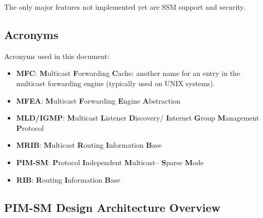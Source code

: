\documentclass[11pt]{article}
\begin{document}
The only major features not implemented yet are SSM support and security.


\subsection{Acronyms}

Acronyms used in this document:

\begin{itemize}

  \item {\bf MFC}: {\bf M}ulticast {\bf F}orwarding {\bf C}ache: another
  name for an entry in the multicast forwarding engine (typically used
  on UNIX systems).

  \item {\bf MFEA}: {\bf M}ulticast {\bf F}orwarding {\bf E}ngine
  {\bf A}bstraction

  \item {\bf MLD/IGMP}: {\bf M}ulticast {\bf L}istener {\bf D}iscovery/{\bf
  I}nternet {\bf G}roup {\bf M}anagement {\bf P}rotocol

  \item {\bf MRIB}: {\bf M}ulticast {\bf R}outing {\bf I}nformation
  {\bf B}ase

  \item {\bf PIM-SM}: {\bf P}rotocol {\bf I}ndependent {\bf M}ulticast--{\bf
  S}parse {\bf M}ode

  \item {\bf RIB}: {\bf R}outing {\bf I}nformation {\bf B}ase

\end{itemize}


\subsection{PIM-SM Design Architecture Overview}
\end{document}
